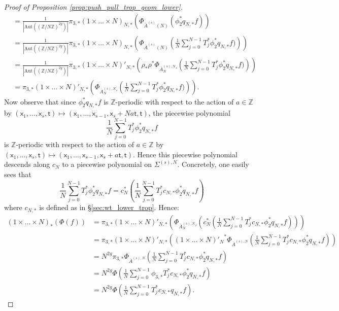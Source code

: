 \documentclass[11pt]{article}
\def\Aut{\mathrm{Aut}}
\newcommand{\barA}{\overline{A}}
\theoremstyle{definition}
\begin{document}
\begin{proof}[Proof of Proposition \ref{prop:push_pull_trop_geom_lower}]
{\begin{align*}
											  &=\frac{1}{|\Aut((\mathbb{Z}/N\mathbb{Z})^{2g})|}\pi_{3,\ast}(1\times\dots\times N)_{N,\ast}(\Phi_{\barA^{(s)}(N)}(\phi_2^{\ast}q_{N,\ast}f))\\
											  &=\frac{1}{|\Aut((\mathbb{Z}/N\mathbb{Z})^{2g})|}\pi_{3,\ast}(1\times\dots\times N)_{N,\ast}\left(\Phi_{\barA^{(s)}(N)}\left(\frac{1}{N}\sum_{j=0}^{N-1}T_j^{\ast}\phi_2^{\ast}q_{N,\ast}f)\right)\right)\\
											  &=\frac{1}{|\Aut((\mathbb{Z}/N\mathbb{Z})^{2g})|}\pi_{3,\ast}(1\times\dots\times N)'_{N,\ast}\left(\rho_{\ast}\rho^{\ast}\Phi_{{\barA_N^{(s),N}}'}\left(\frac{1}{N}\sum_{j=0}^{N-1}T_j^{\ast}\phi_2^{\ast}q_{N,\ast}f)\right)\right)\\
											  &=\pi_{3,\ast}(1\times\dots\times N)'_{N,\ast}\left(\Phi_{{\barA_N^{(s),N}}'}\left(\frac{1}{N}\sum_{j=0}^{N-1}T_j^{\ast}\phi_2^{\ast}q_{N,\ast}f)\right)\right).
	\end{align*}}
	Now observe that since $\phi_2^{\ast}q_{N,\ast}f$ is
	$\mathbb{Z}$-periodic with respect
	to the action of $a\in \mathbb{Z}$ by
	$(\mathsf{x}_1,\dots,\mathsf{x}_s,\mathsf{t})\mapsto (\mathsf{x}_1,\dots,\mathsf{x}_{s-1},\mathsf{x}_s+Na\mathsf{t},\mathsf{t})$,
	the piecewise polynomial
	$$\frac{1}{N}\sum_{j=0}^{N-1}T_j^{\ast}\phi_2^{\ast}q_{N,\ast}f$$
	is $\mathbb{Z}$-periodic with respect to the action of
	$a\in \mathbb{Z}$ by $(\mathsf{x}_1,\dots,\mathsf{x}_s,\mathsf{t})\mapsto (\mathsf{x}_1,\dots,\mathsf{x}_{s-1},\mathsf{x}_s+a\mathsf{t},\mathsf{t})$.
	Hence this piecewise polynomial descends along $c_N$ to a piecewise polynomial
	on $\Sigma^{(s),N}$. Concretely, one easily sees that
	$$\frac{1}{N}\sum_{j=0}^{N-1}T_j^{\ast}\phi_2^{\ast}q_{N,\ast}f=c_N^{\ast}\left(\frac{1}{N}\sum_{j=0}^{N-1}T_j^{\ast}c_{N,\ast}\phi_2^{\ast}q_{N,\ast}f\right)$$
	where $c_{N,\ast}$ is defined as in \S\ref{sec:wt_lower_trop}.
	Hence:
    {\allowdisplaybreaks
	\begin{align*}
		(1\times\dots\times N)_{\ast}(\Phi(f))&=\pi_{3,\ast}(1\times\dots\times N)'_{N,\ast}\left(\Phi_{{\barA_N^{(s),N}}'}\left(c_N^{\ast}\left(\frac{1}{N}\sum_{j=0}^{N-1}T_j^{\ast}c_{N,\ast}\phi_2^{\ast}q_{N,\ast}f\right)\right)\right)\\
											  &=\pi_{3,\ast}(1\times\dots\times N)'_{N,\ast}\left({(1\times \dots\times N)'_{N}}^{\ast}\Phi_{{\barA^{(s),N}}}\left(\frac{1}{N}\sum_{j=0}^{N-1}T_j^{\ast}c_{N,\ast}\phi_2^{\ast}q_{N,\ast}f\right)\right)\\
											  &=N^{2g}\pi_{3,\ast}\Phi_{{\barA^{(s),N}}}\left(\frac{1}{N}\sum_{j=0}^{N-1}T_j^{\ast}c_{N,\ast}\phi_2^{\ast}q_{N,\ast}f\right)\\
											  &=N^{2g}\Phi\left(\frac{1}{N}\sum_{j=0}^{N-1}\phi_{3,\ast}T_j^{\ast}c_{N,\ast}\phi_2^{\ast}q_{N,\ast}f\right)\\
											  &=N^{2g}\Phi\left(\frac{1}{N}\sum_{j=0}^{N-1}T_j^{\ast}c_{N,\ast}q_{N,\ast}f\right).
	\end{align*}}
\end{proof}
\end{document}
